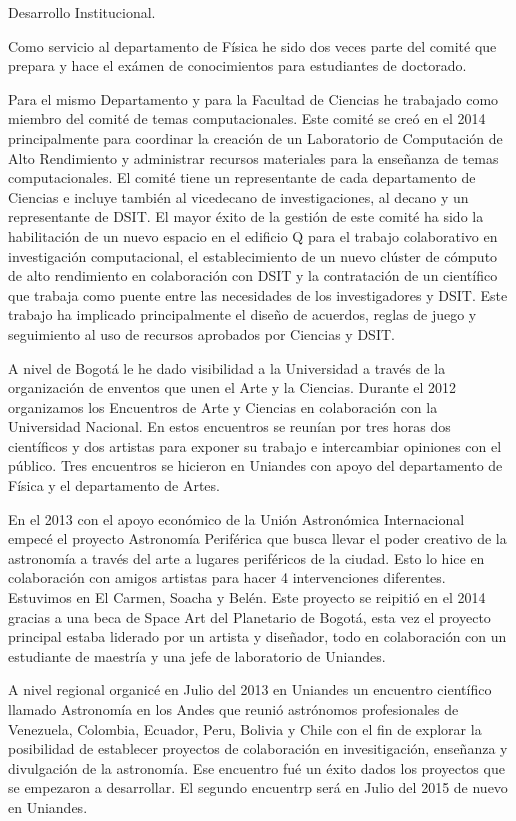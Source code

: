 Desarrollo Institucional.

Como servicio al departamento de Física he sido dos veces parte del
comité que prepara y hace el exámen de conocimientos para estudiantes
de doctorado. 

Para el mismo Departamento y para la Facultad de Ciencias he trabajado
como miembro del comité de temas computacionales. Este comité se creó
en el 2014 principalmente para coordinar la creación de un Laboratorio
de Computación de Alto Rendimiento y administrar recursos materiales
para la enseñanza de temas computacionales. El comité tiene un
representante de cada departamento de Ciencias e incluye también al vicedecano
de investigaciones, al decano y un representante de DSIT. El mayor éxito de la
gestión de este comité ha sido la habilitación de un nuevo espacio en el edificio Q
para el trabajo colaborativo en investigación computacional, el
establecimiento de un nuevo clúster de cómputo de alto rendimiento en
colaboración con DSIT y la contratación de un científico que trabaja
como puente entre las necesidades de los investigadores y DSIT. Este
trabajo ha implicado principalmente el diseño de acuerdos, reglas de
juego y seguimiento al uso de recursos aprobados por Ciencias y DSIT.

A nivel de Bogotá le he dado visibilidad a la Universidad a través de
la organización de enventos que unen el Arte y la Ciencias. Durante el
2012 organizamos los Encuentros de Arte y Ciencias en colaboración con
la Universidad Nacional. En estos encuentros se reunían por tres horas
dos científicos y dos artistas para exponer su trabajo e intercambiar
opiniones con el público. Tres encuentros se hicieron en Uniandes con
apoyo del departamento de Física y el departamento de Artes.

En el 2013 con el apoyo económico de la Unión Astronómica
Internacional empecé el proyecto Astronomía Periférica que busca
llevar el poder creativo de la astronomía a través del arte a lugares
periféricos de la ciudad. Esto lo hice en colaboración con amigos
artistas para hacer 4 intervenciones diferentes. Estuvimos en El
Carmen, Soacha y Belén. Este proyecto se reipitió en el 2014 gracias a
una beca de Space Art del Planetario de Bogotá, esta vez el proyecto
principal estaba liderado por un artista y diseñador, todo en
colaboración con un estudiante de maestría y una jefe de laboratorio
de Uniandes.

A nivel regional organicé en Julio del 2013 en Uniandes un encuentro científico
llamado Astronomía en los Andes que reunió astrónomos profesionales de
Venezuela, Colombia, Ecuador, Peru, Bolivia y Chile con el fin de
explorar la posibilidad de establecer proyectos de colaboración en
invesitigación, enseñanza y divulgación de la astronomía. Ese
encuentro fué un éxito dados los proyectos que se empezaron a
desarrollar. El segundo encuentrp será en Julio del 2015 de nuevo en
Uniandes. 

